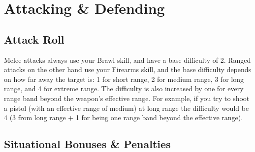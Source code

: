 \section{Attacking \& Defending}

\subsection{Attack Roll}
Melee attacks always use your Brawl skill, and have a base difficulty of 2.
Ranged attacks on the other hand use your Firearms skill, 
and the base difficulty depends on how far away the target is:
1 for short range, 2 for medium range, 3 for long range, and 4 for extreme range.
The difficulty is also increased by one for every range band beyond the weapon's effective range.
For example, if you try to shoot a pistol (with an effective range of medium) at long range
the difficulty would be 4 (3 from long range + 1 for being one range band beyond the effective range). 


\subsection{Situational Bonuses \& Penalties}
    


